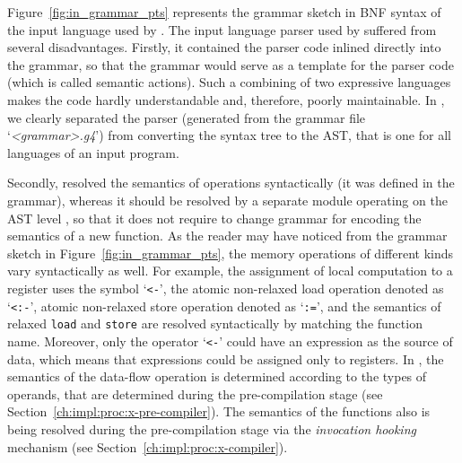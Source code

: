 Figure~\ref{fig:in_grammar_pts} represents the grammar sketch in BNF syntax of the input language used by \porthos[1].
The input language parser used by \porthos{} suffered from several disadvantages.
Firstly, it contained the parser code inlined directly into the grammar, so that the grammar would serve as a template for the parser code (which is called semantic actions).
Such a combining of two expressive languages makes the code hardly understandable and, therefore, poorly maintainable.
In \porthos[2], we clearly separated the parser (generated from the grammar file `\textit{<grammar>.g4}') from converting the  syntax tree to the AST, that is one for all languages of an input program.

Secondly, \porthos{} resolved the semantics of operations syntactically (it was defined in the  grammar), whereas it should be resolved by a separate module operating on the AST level%
%
%
, so that it does not require to change grammar for encoding the semantics of a new function. %
As the reader may have noticed from the grammar sketch in Figure~\ref{fig:in_grammar_pts}, the memory operations of different kinds vary syntactically as well.
For example, the assignment of local computation to a register uses the symbol `\lstinline{<-}', the atomic non-relaxed load operation denoted as `\lstinline{<:-}', atomic non-relaxed store operation denoted as `\lstinline{:=}', and the semantics of relaxed \lstinline{load} and \lstinline{store} are resolved syntactically by matching the function name.
Moreover, only the operator `\lstinline{<-}' could have an expression as the source of data, which means that expressions could be assigned only to registers.
In \porthos[2], the semantics of the data-flow operation is determined according to the types of operands, that are determined during the pre-compilation stage (see Section~\ref{ch:impl:proc:x-pre-compiler}).
The semantics of the functions also is being resolved during the pre-compilation stage via the \textit{invocation hooking} mechanism (see Section~\ref{ch:impl:proc:x-compiler}).

